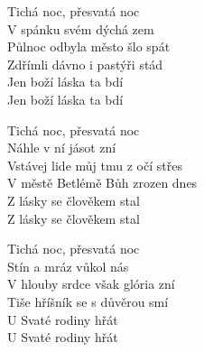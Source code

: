 
\ve{}
Tichá noc, přesvatá noc\\
V spánku svém dýchá zem\\
Půlnoc odbyla město šlo spát\\
Zdřímli dávno i pastýři stád\\
Jen boží láska ta bdí \\
Jen boží láska ta bdí

\ve{}
Tichá noc, přesvatá noc\\
Náhle v ní jásot zní\\
Vstávej lide můj tmu z očí střes\\
V městě Betlémě Bůh zrozen dnes\\
Z lásky se člověkem stal\\
Z lásky se člověkem stal

\ve{}
Tichá noc, přesvatá noc\\
Stín a mráz vůkol nás\\
V hlouby srdce však glória zní\\
Tiše hříšník se s důvěrou smí\\
U Svaté rodiny hřát\\
U Svaté rodiny hřát

\esong{}

